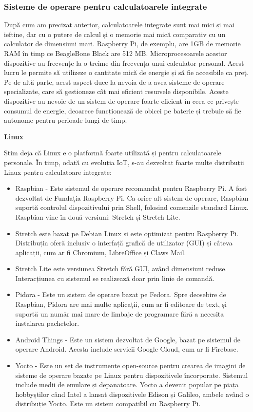 \subsubsection{Sisteme de operare pentru calculatoarele integrate}
\label{sec:embed:micro-comp:embed:os}

După cum am precizat anterior, calculatoarele integrate sunt mai mici și mai
ieftine, dar cu o putere de calcul și o memorie mai mică comparativ cu un
calculator de dimensiuni mari. Raspberry Pi, de exemplu, are 1GB de memorie RAM
în timp ce BeagleBone Black are 512 MB. Microprocesoarele acestor dispozitive au
frecvențe la o treime din frecvența unui calculator personal. Acest lucru le
permite să utilizeze o cantitate mică de energie și să fie accesibile ca preț.
Pe de altă parte, acest aspect duce la nevoia de a avea sisteme de operare
specializate, care să gestioneze cât mai eficient resursele disponibile. Aceste
dispozitive au nevoie de un sistem de operare foarte eficient în ceea ce
privește consumul de energie, deoarece funcționează de obicei pe baterie
și trebuie să fie autonome pentru perioade lungi de timp.

\textbf{Linux}

Știm deja că Linux e o platformă foarte utilizată și pentru calculatoarele
personale. În timp, odată cu evoluția IoT, s-au dezvoltat foarte multe
distribuții Linux pentru calculatoare integrate:

\begin{itemize}
	\item Raspbian - Este sistemul de operare recomandat pentru Raspberry
		Pi. A fost dezvoltat de Fundația Raspberry Pi. Ca orice alt
		sistem de operare, Raspbian suportă controlul dispozitivului
		prin Shell, folosind comenzile standard Linux. Raspbian vine în
		două versiuni: Stretch și Stretch Lite.
	\item Stretch este bazat pe Debian Linux și este optimizat pentru
		Raspberry Pi. Distribuția oferă inclusiv o interfață grafică de
		utilizator (GUI) și câteva aplicații, cum ar fi Chromium,
		LibreOffice și Claws Mail.
	\item Stretch Lite este versiunea Stretch fără GUI, având dimensiuni
		reduse. Interacțiunea cu sistemul se realizează doar prin linie
		de comandă.
	\item Pidora - Este un sistem de operare bazat pe Fedora. Spre deosebire
		de Raspbian, Pidora are mai multe aplicații, cum ar fi editoare
		de text, și suportă un număr mai mare de limbaje de programare
		fără a necesita instalarea pachetelor.
	\item Android Things - Este un sistem dezvoltat de Google, bazat pe
		sistemul de operare Android. Acesta include servicii Google
		Cloud, cum ar fi Firebase.
	\item Yocto - Este un set de instrumente open-source pentru
		crearea de imagini de sisteme de operare bazate pe Linux pentru
		dispozitivele încorporate. Sistemul include medii de emulare și
		depanatoare. Yocto a devenit popular pe piața hobbyștilor când
		Intel a lansat dispozitivele Edison și Galileo, ambele având o
		distribuție Yocto. Este un sistem compatibil cu Raspberry Pi.
\end{itemize}

